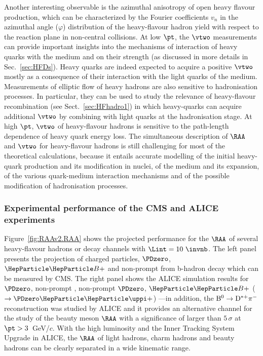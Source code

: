 Another interesting observable is the azimuthal anisotropy of open heavy flavour production, which can be characterized by the Fourier coefficients $v_n$ in the azimuthal angle ($\varphi$) distribution of the heavy-flavour hadron yield with respect to the reaction plane in non-central \PbPb collisions. 
At low $\pt$, the $\vtwo$ measurements can provide important insights into the mechanisms of interaction of heavy quarks with the medium and on their strength (as discussed in more details in Sec.~\ref{sec:HFDs}). Heavy quarks are indeed expected to acquire a positive $\vtwo$ mostly as a consequence of their interaction with the light quarks of the medium.
Measurements of elliptic flow of heavy hadrons are also sensitive to hadronisation processes. In particular, they can be used to study the relevance of heavy-flavour recombination (see Sect.~\ref{sec:HFhadro1}) in which heavy-quarks can acquire additional $\vtwo$ by combining with light quarks at the hadronisation stage. 
At high $\pt$, $\vtwo$ of heavy-flavour hadrons is sensitive to the path-length dependence of heavy quark energy loss. The simultaneous description of $\RAA$ and $\vtwo$ for heavy-flavour hadrons is still challenging for most of the theoretical calculations, because it entails accurate modelling of the initial heavy-quark production and its modification in nuclei, of the medium and its expansion, of the various quark-medium interaction mechanisms and of the possible modification of hadronisation processes.


\subsubsection{Experimental performance of the CMS and ALICE experiments}
\label{sec:HFRAAv2}

Figure~\ref{fig:RAAv2.RAA} shows the projected performance for the $\RAA$ of several heavy-flavour hadrons or decay channels with $\Lint=10~\invnb$. The left panel presents the projection of charged particles, $\PDzero$, $\PBp$ and non-prompt \PJGy from b-hadron decay which can be measured by CMS. The right panel shows the ALICE simulation results for $\PDzero$, non-prompt \PJGy, non-prompt $\PDzero$, $\PBp$ ($\rightarrow \PDzero \PGpp$) 
---in addition, the $\rm B^0\rightarrow D^{*+}\pi^-$ reconstruction was studied by ALICE and it provides an alternative channel for the study of the beauty meson $\RAA$ with a significance of larger than $5\,\sigma$ at $\pt > 3$~GeV/$c$. With the high luminosity and the Inner Tracking System Upgrade in ALICE, the $\RAA$ of light hadrons, charm hadrons and beauty hadrons can be clearly separated in a wide kinematic range.

